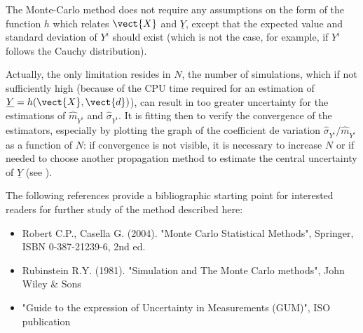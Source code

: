{
  The Monte-Carlo method does not require any assumptions on the form of the function $h$ which relates $\vect{X}$ and $\underline{Y}$, except that the expected value and standard deviation of $Y^i$ should exist (which is not the case, for example, if $Y^i$ follows the Cauchy distribution).

  Actually, the only limitation resides in $N$, the number of simulations, which if not sufficiently high (because of the CPU time required for an estimation of $\underline{Y}=h(\vect{X},\vect{d})$), can result in too greater uncertainty for the estimations of  $\widehat{m}_{Y^i}$ and $\widehat{\sigma}_{Y^i}$. It is fitting then to verify the convergence of the estimators, especially by plotting the graph of the coefficient de variation  $\widehat{\sigma}_{Y^i} / \widehat{m}_{Y^i}$ as a function of $N$: if convergence is not visible, it is necessary to increase $N$ or if needed to choose another propagation method to estimate the central uncertainty of $\underline{Y}$ (see ).

  The following references provide a bibliographic starting point for interested readers for further study of the method described here:
  \begin{itemize}
  \item Robert C.P., Casella G. (2004). "Monte Carlo Statistical Methods", Springer, ISBN 0-387-21239-6, 2nd ed.
  \item Rubinstein R.Y. (1981). "Simulation and The Monte Carlo methods", John Wiley \& Sons
  \item "Guide to the expression of Uncertainty in Measurements (GUM)", ISO publication
  \end{itemize}
}
